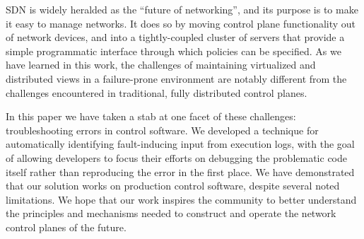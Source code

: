 
SDN is widely heralded as the ``future of networking'', and its purpose is to make
it easy to manage networks. It does so by moving control plane functionality out of
network devices, and into a tightly-coupled cluster of servers that provide a simple
programmatic interface through which policies can be specified. As we have
learned in this work, the challenges of maintaining virtualized and distributed
views in a failure-prone environment are
notably different from the challenges encountered in traditional,
fully distributed control planes.

In this paper we have taken a stab at one facet of these challenges:
troubleshooting errors in control software. We developed a technique for automatically
identifying fault-inducing input from execution logs, with the
goal of allowing developers to focus their efforts on debugging the problematic
code itself rather than reproducing the error in the first place. We have
demonstrated that our solution works on production control software,
despite several noted limitations. We hope that our work inspires the community to
better understand the principles and mechanisms needed to construct and
operate the network control planes of the future.


